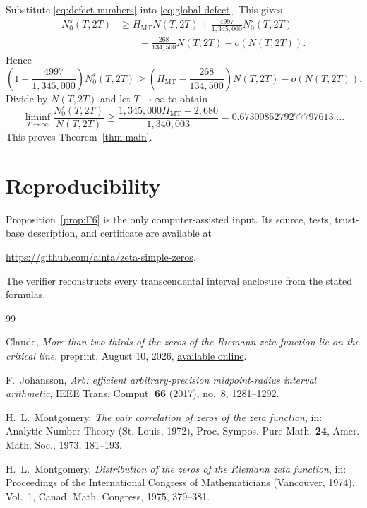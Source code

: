 \documentclass[11pt]{article}
\begin{document}
Substitute \eqref{eq:defect-numbers} into \eqref{eq:global-defect}.  This gives
\begin{align*}
 N_0^s(T,2T)
 &\ge H_{\mathrm{MT}}N(T,2T)
 +\frac{4997}{1{,}345{,}000}N_0^s(T,2T)\\
 &\qquad-\frac{268}{134{,}500}N(T,2T)-o(N(T,2T)).
\end{align*}
Hence
\[
 \left(1-\frac{4997}{1{,}345{,}000}\right)N_0^s(T,2T)
 \ge
 \left(H_{\mathrm{MT}}-\frac{268}{134{,}500}\right)N(T,2T)
 -o(N(T,2T)).
\]
Divide by $N(T,2T)$ and let $T\to\infty$ to obtain
\[
 \liminf_{T\to\infty}\frac{N_0^s(T,2T)}{N(T,2T)}
 \ge
 \frac{1{,}345{,}000H_{\mathrm{MT}}-2{,}680}{1{,}340{,}003}
 =0.6730085279277797613\ldots .
\]
This proves Theorem~\ref{thm:main}.

\section*{Reproducibility}

Proposition~\ref{prop:F6} is the only computer-assisted input.  Its source,
tests, trust-base description, and certificate are available at
\begin{center}
\url{https://github.com/ainta/zeta-simple-zeros}.
\end{center}
The verifier reconstructs every transcendental interval enclosure from the
stated formulas.

\begin{thebibliography}{99}

Claude,
\emph{More than two thirds of the zeros of the Riemann zeta function lie on the critical line},
preprint, August 10, 2026,
\href{https://www-cdn.anthropic.com/564f962e60643842f5fcb4a17c9dbc8f608f1c37.pdf}
{available online}.

F.~Johansson,
\emph{Arb: efficient arbitrary-precision midpoint-radius interval arithmetic},
IEEE Trans. Comput. \textbf{66} (2017), no.~8, 1281--1292.

H.~L.~Montgomery,
\emph{The pair correlation of zeros of the zeta function},
in: Analytic Number Theory (St. Louis, 1972),
Proc. Sympos. Pure Math. \textbf{24}, Amer. Math. Soc., 1973, 181--193.

H.~L.~Montgomery,
\emph{Distribution of the zeros of the Riemann zeta function},
in: Proceedings of the International Congress of Mathematicians
(Vancouver, 1974), Vol.~1,
Canad. Math. Congress, 1975, 379--381.

\end{thebibliography}
\end{document}
